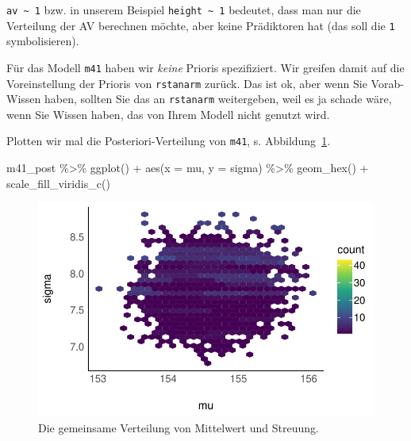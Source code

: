 \documentclass[
  a4paper,
  DIV=11]{scrreprt}
\newenvironment{Shaded}{\begin{snugshade}}{\end{snugshade}}
\newcommand{\AttributeTok}[1]{\textcolor[rgb]{0.40,0.45,0.13}{#1}}
\newcommand{\FunctionTok}[1]{\textcolor[rgb]{0.28,0.35,0.67}{#1}}
\newcommand{\NormalTok}[1]{\textcolor[rgb]{0.00,0.23,0.31}{#1}}
\newcommand{\SpecialCharTok}[1]{\textcolor[rgb]{0.37,0.37,0.37}{#1}}
\theoremstyle{definition}
\theoremstyle{remark}
\begin{document}
\texttt{av\ \textasciitilde{}\ 1} bzw. in unserem Beispiel
\texttt{height\ \textasciitilde{}\ 1} bedeutet, dass man nur die
Verteilung der AV berechnen möchte, aber keine Prädiktoren hat (das soll
die \texttt{1} symbolisieren).

Für das Modell \texttt{m41} haben wir \emph{keine} Prioris spezifiziert.
Wir greifen damit auf die Voreinstellung der Prioris von
\texttt{rstanarm} zurück. Das ist ok, aber wenn Sie Vorab-Wissen haben,
sollten Sie das an \texttt{rstanarm} weitergeben, weil es ja schade
wäre, wenn Sie Wissen haben, das von Ihrem Modell nicht genutzt wird.

Plotten wir mal die Posteriori-Verteilung von \texttt{m41}, s.
Abbildung~\ref{fig-m42-post-joint}.

\begin{Shaded}
\begin{Highlighting}[]
\NormalTok{m41\_post }\SpecialCharTok{\%\textgreater{}\%} 
  \FunctionTok{ggplot}\NormalTok{() }\SpecialCharTok{+}
  \FunctionTok{aes}\NormalTok{(}\AttributeTok{x =}\NormalTok{ mu, }\AttributeTok{y =}\NormalTok{ sigma) }\SpecialCharTok{\%\textgreater{}\%} 
  \FunctionTok{geom\_hex}\NormalTok{() }\SpecialCharTok{+}
  \FunctionTok{scale\_fill\_viridis\_c}\NormalTok{() }
\end{Highlighting}
\end{Shaded}

\begin{figure}[H]

{\centering \includegraphics{./gauss_files/figure-pdf/fig-m42-post-joint-1.pdf}

}

\caption{\label{fig-m42-post-joint}Die gemeinsame Verteilung von
Mittelwert und Streuung.}

\end{figure}
\end{document}
